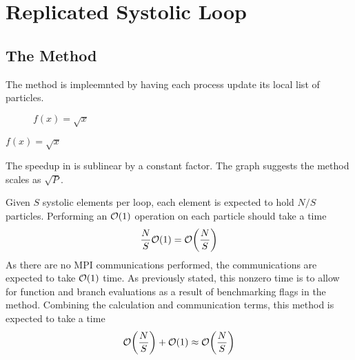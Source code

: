 \section{Replicated Systolic Loop}


\subsection{The \individualoperation{} Method}

The \individualoperation{} method is impleemnted by having each process
update its local list of particles.

%
%
\begin{figure}[!h]
    
    \caption{
        \vZeroSpeedupCaption
            {\replicatedsystolicloop{}}
            {\individualoperation{}}
            {$f(x) = \sqrt{x}$}
    }
    \label{fig:v1_replicated_systolic_loop_individual_operation_speedups}
\end{figure}


\vZeroSpeedupExplanation
    {}
    {\replicatedsystolicloop{}}
    {\individualoperation{}}
    {$f(x) = \sqrt{x}$}

%

The speedup in
is sublinear by a constant factor.
%
The graph suggests the method scales as $\sqrt{P}$.

%

Given $S$ systolic elements per loop, each element is expected to
hold $N/S$ particles.
%
Performing an $\mathcal{O}{\left({ 1 }\right)}$ operation on each particle should take a time
\begin{equation}
    \frac{N}{S}\mathcal{O}{\left({ 1 }\right)} = \mathcal{O}{\left({ \frac{N}{S} }\right)}
\end{equation}
%
As there are no MPI communications performed, the communications are expected
to take $\mathcal{O}{\left({ 1 }\right)}$ time.
%
As previously stated, this nonzero time is to allow for function
and branch evaluations as a result of benchmarking flags in the method.
%
Combining the calculation and communication terms, this method
is expected to take a time
\begin{equation}
    \mathcal{O}{\left({ \frac{N}{S} }\right)} + \mathcal{O}{\left({ 1 }\right)} \approx{} \mathcal{O}{\left({ \frac{N}{S} }\right)}
\end{equation}


